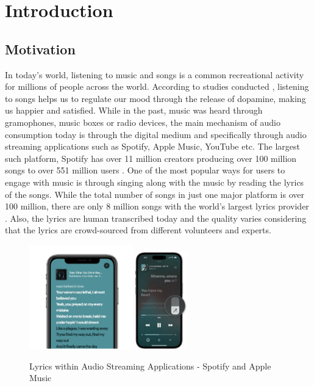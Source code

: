 
\chapter{Introduction} 
\label{sec:thesisintroduction}

\section{Motivation}%
\label{sec:motivation}

In today’s world, listening to music and songs is a common recreational activity for millions of people across the world. According to studies conducted \cite{salimpoor2011anatomically}, listening to songs helps us to regulate our mood through the release of dopamine, making us happier and satisfied. While in the past, music was heard through gramophones, music boxes or radio devices, the main mechanism of audio consumption today is through the digital medium and specifically through audio streaming applications such as Spotify, Apple Music, YouTube etc. The largest such platform, Spotify has over 11 million creators producing over 100 million songs to over 551 million users \cite{Spotify_2023} . One of the most popular ways for users to engage with music is through singing along with the music by reading the lyrics of the songs. While the total number of songs in just one major platform is over 100 million, there are only 8 million songs with the world’s largest lyrics provider \cite{musixmatch_2023}. Also, the lyrics are human transcribed today and the quality varies considering that the lyrics are crowd-sourced from different volunteers and experts.

\begin{figure}
    \centering
    \includegraphics[width=0.4\textwidth]{01-introduction/figures/spotify_lyrics.pdf}
    \includegraphics[width=0.2\textwidth]{01-introduction/figures/applemusic_lyrics.pdf}
    \caption{Lyrics within Audio Streaming Applications - Spotify and Apple Music}%
    \label{fig:setup0}
\end{figure}

